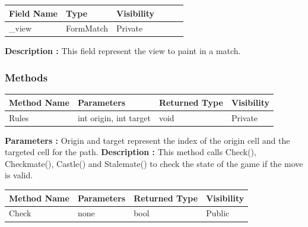 \documentclass[12pt]{article}
\begin{document}
\begin{table}[H]
    \begin{tabular}{llllll}
    \hline
    \multicolumn{1}{|l|}{\cellcolor[HTML]{EFEFEF}\textbf{Field Name}} & \multicolumn{1}{l|}{\cellcolor[HTML]{EFEFEF}\textbf{Type}} & \multicolumn{1}{l|}{\cellcolor[HTML]{EFEFEF}\textbf{Visibility}} \\ \hline
    \multicolumn{1}{|l|}{\_view}                                      & \multicolumn{1}{l|}{FormMatch}                                 & \multicolumn{1}{l|}{Private}                                     \\ \hline
    \end{tabular}
\end{table}

\textbf{Description :} This field represent the view to paint in a match.

\subsubsection{Methods}

\begin{table}[H]
    \begin{tabular}{|l|l|l|l|}
    \hline
    \rowcolor[HTML]{EFEFEF} 
    \cellcolor[HTML]{EFEFEF}\textbf{Method Name} & \textbf{Parameters}    & \textbf{Returned Type} & \textbf{Visibility} \\ \hline
    Rules                                        & int origin, int target & void                   & Private             \\ \hline
    \end{tabular}
\end{table}

\textbf{Parameters :} Origin and target represent the index of the origin cell and the targeted cell for the path.
\textbf{Description :} This method calls Check(), Checkmate(), Castle() and Stalemate() to check the state of the game if the move is valid.


\begin{table}[H]
    \begin{tabular}{|l|l|l|l|}
    \hline
    \rowcolor[HTML]{EFEFEF} 
    \cellcolor[HTML]{EFEFEF}\textbf{Method Name} & \textbf{Parameters}    & \textbf{Returned Type} & \textbf{Visibility} \\ \hline
    Check                                        & none                   & bool                   & Public              \\ \hline
    \end{tabular}
\end{table}
\end{document}
